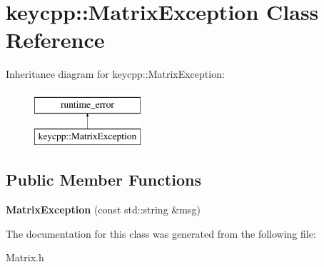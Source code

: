 \hypertarget{classkeycpp_1_1_matrix_exception}{\section{keycpp\-:\-:Matrix\-Exception Class Reference}
\label{classkeycpp_1_1_matrix_exception}
}
Inheritance diagram for keycpp\-:\-:Matrix\-Exception\-:\begin{figure}[H]
\begin{center}
\leavevmode
\includegraphics[height=2.000000cm]{classkeycpp_1_1_matrix_exception}
\end{center}
\end{figure}
\subsection*{Public Member Functions}
\begin{DoxyCompactItemize}
\item 
\hypertarget{classkeycpp_1_1_matrix_exception_ae558e1658f52404739cbb6fe784f196d}{{\bfseries Matrix\-Exception} (const std\-::string \&msg)}\label{classkeycpp_1_1_matrix_exception_ae558e1658f52404739cbb6fe784f196d}

\end{DoxyCompactItemize}


The documentation for this class was generated from the following file\-:\begin{DoxyCompactItemize}
\item 
Matrix.\-h\end{DoxyCompactItemize}
